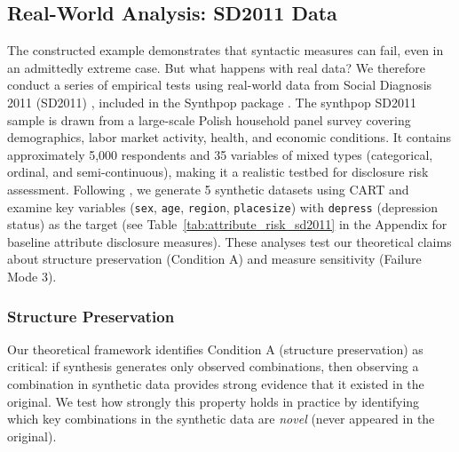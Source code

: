 \documentclass[Afour,sageh,times,doublespace]{sagej}
\begin{document}
\subsection{Real-World Analysis: SD2011 Data}

The constructed example demonstrates that syntactic measures can fail, even in an admittedly extreme case. But what happens with real data? We therefore conduct a series of empirical tests using real-world data from Social Diagnosis 2011 (SD2011) \citep{czapinski2011social}, included in the Synthpop package \citep{Nowok2016}. The synthpop SD2011 sample is drawn from a large-scale Polish household panel survey covering demographics, labor market activity, health, and economic conditions. It contains approximately 5,000 respondents and 35 variables of mixed types (categorical, ordinal, and semi-continuous), making it a realistic testbed for disclosure risk assessment. Following \citet{raab2026}, we generate 5 synthetic datasets using CART and examine key variables (\texttt{sex}, \texttt{age}, \texttt{region}, \texttt{placesize}) with \texttt{depress} (depression status) as the target (see Table~\ref{tab:attribute_risk_sd2011} in the Appendix for baseline attribute disclosure measures). These analyses test our theoretical claims about structure preservation (Condition A) and measure sensitivity (Failure Mode 3).

\subsubsection{Structure Preservation}
\label{sec:structure_preservation}

Our theoretical framework identifies Condition A (structure preservation) as critical: if synthesis generates only observed combinations, then observing a combination in synthetic data provides strong evidence that it existed in the original. We test how strongly this property holds in practice by identifying which key combinations in the synthetic data are \textit{novel} (never appeared in the original).
\end{document}
